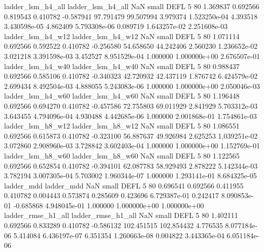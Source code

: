        ladder_lsm_h4_all        ladder_lsm_h4_all                   NaN      small     DEFL                 5 80 1.369837       0.692566 0.819543       0.410782   -0.587941     97.791479     99.507994     3.979374   1.523250e-04  4.393518 3.430598e-05     4.862409   5.793308e-06            0.089719    1.643257e-02        2.251608e-03
       ladder_lsm_h4_w12        ladder_lsm_h4_w12                   NaN      small     DEFL                 5 80 1.071114       0.692566 0.592522       0.410782   -0.256580     54.658650     44.242406     2.560230   1.236652e-02  3.021218 3.391598e-03     3.452527   8.951529e-04            1.000000    1.000000e+00        2.676507e-01
       ladder_lsm_h4_w40        ladder_lsm_h4_w40                   NaN      small     DEFL                 5 80 0.988437       0.692566 0.585106       0.410782   -0.340323     42.720932     42.437119     1.876742   6.424579e-02  2.699434 8.492504e-03     4.888055   5.243083e-06            1.000000    1.000000e+00        2.050046e-03
       ladder_lsm_h4_w60        ladder_lsm_h4_w60                   NaN      small     DEFL                 5 80 1.196448       0.692566 0.694270       0.410782   -0.457586     72.755803     69.011929     2.841929   5.703312e-03  3.643455 4.794096e-04     4.930488   4.442685e-06            1.000000    2.001868e-01        1.754861e-03
       ladder_lsm_h8_w12        ladder_lsm_h8_w12                   NaN      small     DEFL                 5 80 1.086551       0.692566 0.615873       0.410782   -0.323100     56.887637     49.926984     2.625253   1.039251e-02  3.072860 2.908960e-03     3.728842   3.602403e-04            1.000000    1.000000e+00        1.152769e-01
       ladder_lsm_h8_w60        ladder_lsm_h8_w60                   NaN      small     DEFL                 5 80 1.122565       0.692566 0.652854       0.410782   -0.394101     62.087783     58.929493     2.878222   5.142344e-03  3.782194 3.007305e-04     5.703002   1.960344e-07            1.000000    1.293141e-01        8.684325e-05
              ladder_mdd               ladder_mdd                   NaN      small     DEFL                 5 80 0.696541       0.692566 0.411955       0.410782    0.004443      0.573874      0.285609     0.423696   6.729387e-01  0.242417 8.090853e-01    -0.685868   4.948045e-01            1.000000    1.000000e+00        1.000000e+00
      ladder_rmse_h1_all       ladder_rmse_h1_all                   NaN      small     DEFL                 5 80 1.402111       0.692566 0.833289       0.410782   -0.586132    102.451515    102.854432     4.776535   8.077184e-06  5.414084 6.436197e-07     6.351354   1.260663e-08            0.004822    3.443365e-04        6.051184e-06
